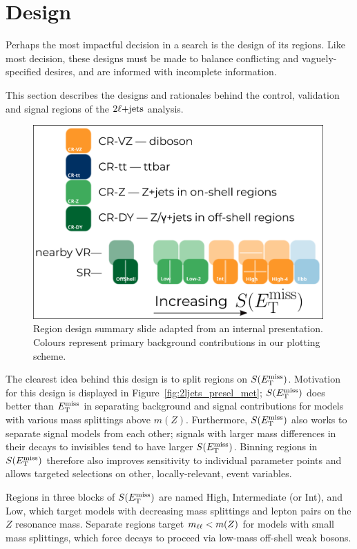 \FloatBarrier
\section{Design}
Perhaps the most impactful decision in a search is the design of its regions.
Like most decision, these designs must be made to balance conflicting and
vaguely-specified desires, and are informed with incomplete information.

This section describes the designs and rationales behind the control,
validation and signal regions of the $2\ell\mathrm{+jets}$ analysis.

\begin{figure}[tp]
\centering
\includegraphics[width=0.99\textwidth]{figures/2Ljets_pam_ewkslide.png}
\caption[
Region design summary slide
]{%
Region design summary slide adapted from an internal presentation.
Colours represent primary background contributions in our plotting scheme.
}
\label{fig:2ljets_region_summary}
\end{figure}

The clearest idea behind this design is to split regions on $S(E_\mathrm{T}^\mathrm{miss})$.
Motivation for this design is displayed in
Figure~\ref{fig:2ljets_presel_met};
$S(E_\mathrm{T}^\mathrm{miss})$ does better than $E_\mathrm{T}^\mathrm{miss}$ in separating background and signal
contributions for models with various mass splittings above $m(Z)$.
Furthermore, $S(E_\mathrm{T}^\mathrm{miss})$ also works to separate signal models from each other;
signals with larger mass differences in their decays to invisibles tend to have
larger $S(E_\mathrm{T}^\mathrm{miss})$.
Binning regions in $S(E_\mathrm{T}^\mathrm{miss})$ therefore also improves sensitivity to
individual parameter points and allows targeted selections on other,
locally-relevant, event variables.

Regions in three blocks of $S(E_\mathrm{T}^\mathrm{miss})$ are named High, Intermediate (or Int),
and Low,
which target models with decreasing mass splittings and lepton pairs on the
$Z$ resonance mass.
Separate regions target $m_{\ell\ell} < m(Z)$ for models with small mass splittings,
which force decays to proceed via low-mass off-shell weak bosons.


